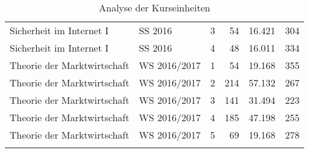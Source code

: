\begin{longtable}{lllrrr}
Sicherheit im Internet I & SS 2016 & 3 & 54 & 16.421 & 304\\
Sicherheit im Internet I & SS 2016 & 4 & 48 & 16.011 & 334\\
Theorie der Marktwirtschaft & WS 2016/2017 & 1 & 54 & 19.168 & 355\\
Theorie der Marktwirtschaft & WS 2016/2017 & 2 & 214 & 57.132 & 267\\
Theorie der Marktwirtschaft & WS 2016/2017 & 3 & 141 & 31.494 & 223\\
Theorie der Marktwirtschaft & WS 2016/2017 & 4 & 185 & 47.198 & 255\\
Theorie der Marktwirtschaft & WS 2016/2017 & 5 & 69 & 19.168 & 278\\
\caption{Analyse der Kurseinheiten}
\label{tab:AnalyseDerKurseinheiten}
\end{longtable}
\normalsize

